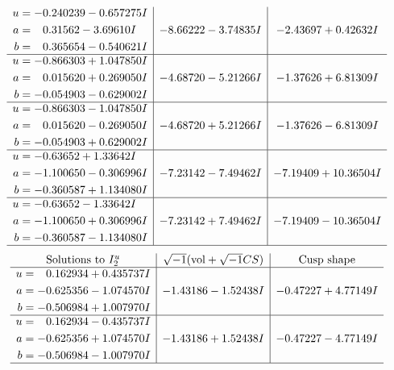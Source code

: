 \documentclass[1p]{elsarticle_modified}
\theoremstyle{definition}
\newcommand{\I}{\sqrt{-1}}
\begin{document}
$$\begin{array}{c|c|c}
\begin{aligned}
u &= -0.240239 - 0.657275 I \\
a &= \phantom{-}0.31562 - 3.69610 I \\
b &= \phantom{-}0.365654 - 0.540621 I\end{aligned}
 & -8.66222 - 3.74835 I & -2.43697 + 0.42632 I \\ \hline\begin{aligned}
u &= -0.866303 + 1.047850 I \\
a &= \phantom{-}0.015620 + 0.269050 I \\
b &= -0.054903 - 0.629002 I\end{aligned}
 & -4.68720 - 5.21266 I & -1.37626 + 6.81309 I \\ \hline\begin{aligned}
u &= -0.866303 - 1.047850 I \\
a &= \phantom{-}0.015620 - 0.269050 I \\
b &= -0.054903 + 0.629002 I\end{aligned}
 & -4.68720 + 5.21266 I & -1.37626 - 6.81309 I \\ \hline\begin{aligned}
u &= -0.63652 + 1.33642 I \\
a &= -1.100650 - 0.306996 I \\
b &= -0.360587 + 1.134080 I\end{aligned}
 & -7.23142 - 7.49462 I & -7.19409 + 10.36504 I \\ \hline\begin{aligned}
u &= -0.63652 - 1.33642 I \\
a &= -1.100650 + 0.306996 I \\
b &= -0.360587 - 1.134080 I\end{aligned}
 & -7.23142 + 7.49462 I & -7.19409 - 10.36504 I\\
 \hline 
 \end{array}$$\newpage$$\begin{array}{c|c|c}  
\text{Solutions to }I^u_{2}& \I (\text{vol} + \sqrt{-1}CS) & \text{Cusp shape}\\
 \hline 
\begin{aligned}
u &= \phantom{-}0.162934 + 0.435737 I \\
a &= -0.625356 - 1.074570 I \\
b &= -0.506984 + 1.007970 I\end{aligned}
 & -1.43186 - 1.52438 I & -0.47227 + 4.77149 I \\ \hline\begin{aligned}
u &= \phantom{-}0.162934 - 0.435737 I \\
a &= -0.625356 + 1.074570 I \\
b &= -0.506984 - 1.007970 I\end{aligned}
 & -1.43186 + 1.52438 I & -0.47227 - 4.77149 I\\
 \hline 
 \end{array}$$\newpage
\end{document}
